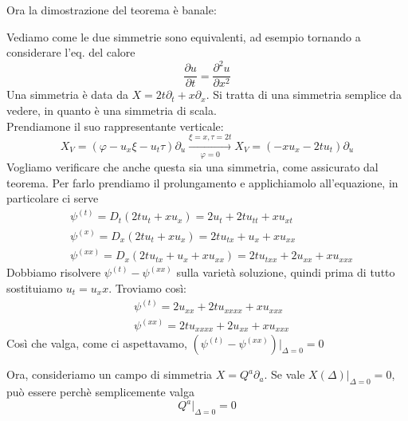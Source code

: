 \documentclass{report}
\begin{document}
Ora la dimostrazione del teorema è banale: 
\pf{}{
    \begin{equation}
        X^{(n)}(\Delta)\biggr|_{S_\Delta} = [X_V^{(n)}(\Delta)] + \xi^iD_i(\Delta)]\biggr|_{S_\Delta} 
    \end{equation}

    Ma $D_i(\Delta)|_{\Delta=0}$ =0, così che le due condizioni si equivalgono. 
}

\begin{example}
    Vediamo come le due simmetrie sono equivalenti, ad esempio tornando a considerare l'eq. del calore 
    \begin{equation}
        \frac{\partial u}{\partial t} = \frac{\partial^2 u}{\partial x^2}
    \end{equation}
    Una simmetria è data da $X = 2t\partial_t + x\partial_x$. Si tratta di una simmetria semplice da vedere, in quanto è una simmetria di scala. \\

    Prendiamone il suo rappresentante verticale: 
    \begin{equation}
        X_V = (\varphi - u_x\xi - u_t\tau)\partial_u \xrightarrow[\varphi =0]{\xi = x, \tau = 2t} X_V = (-xu_x -2tu_t)\partial_u
    \end{equation}
    Vogliamo verificare che anche questa sia una simmetria, come assicurato dal teorema. Per farlo prendiamo il prolungamento e applichiamolo all'equazione, in particolare ci serve 
    \begin{align}
        &\psi^{(t)} = D_t(2tu_t + xu_x) = 2u_t + 2tu_{tt} + xu_{xt} \\
        & \psi^{(x)} = D_x(2tu_t + xu_x) = 2tu_{tx} + u_x + xu_{xx} \\
        & \psi^{(xx)} = D_x(2tu_{tx} + u_x + xu_{xx}) = 2tu_{txx} + 2u_{xx} + xu_{xxx}
    \end{align}
    Dobbiamo risolvere $\psi^{(t)} - \psi^{(xx)}$ sulla varietà soluzione, quindi prima di tutto sostituiamo $u_t = u_xx$. Troviamo così: 
    \begin{align}
        &\psi^{(t)} = 2u_{xx} + 2tu_{xxxx} + xu_{xxx} \\
        &\psi^{(xx)} = 2tu_{xxxx} + 2u_{xx} + xu_{xxx}
    \end{align}
    Così che valga, come ci aspettavamo, $(\psi^{(t)} - \psi^{(xx)})|_{\Delta=0} = 0$
\end{example}


Ora, consideriamo un campo di simmetria $X = Q^a\partial_a$. Se vale $X(\Delta)|_{\Delta=0}=0$, può essere perchè semplicemente valga 
\begin{equation}
    Q^a|_{\Delta=0} = 0
\end{equation}
\end{document}
